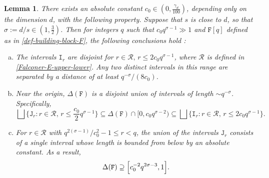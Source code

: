 \documentclass[a4paper,11pt]{amsart}
\newtheorem{lem}[thm]{\bf Lemma}
\numberwithin{equation}{section}
\begin{document}
 \begin{lem} \label{building-block-example-lemma} 
 There exists an absolute constant $c_0 \in (0, \frac{\gamma_d}{100})$, depending only on the dimension $d$, with the following property.
 \vskip0.1in
\noindent Suppose that $s$ is close to $d$, so that $\sigma := d/s \in (1, \frac{3}{2})$. Then for integers $q$ such that $c_0 q^{\sigma - 1} \gg 1$ and $\mathtt F[q]$ defined as in \eqref{def-building-block-F}, the following conclusions hold :
\vskip0.1in 
 \begin{enumerate}[(a)]
 \item The intervals $\mathtt I_r$ are disjoint for $r \in \mathcal R, \, r \leq 2c_0q^{\sigma-1}$, where $\mathcal R$ is defined in \eqref{Falconer-E-upper-lower}.  Any two distinct intervals in this range are separated by a distance of at least $q^{-\sigma}/(8c_0)$.\label{disjointness}
 \vskip0.1in
 \item 
 Near the origin, $\Delta(\mathtt F)$ is a disjoint union of intervals of length $\sim q^{-\sigma}$. Specifically, 
 \begin{equation} \bigsqcup \bigl\{\mathtt J_r : r \in \mathcal R, \, r \leq \frac{c_0}{2}q^{\sigma-1} \bigr\} \subseteq \Delta(\mathtt F) \cap \bigl[0, c_0q^{\sigma-2} \bigr) \subseteq \bigsqcup \bigl\{\mathtt I_r : r \in \mathcal R, \,  r \leq 2c_0 q^{\sigma-1} \bigr\}. \label{F-E-small-r} \end{equation} \label{small-disjoint-intervals}
 \item For $r \in \mathcal R$ with ${q^{2(\sigma-1)}}/{c_0^2} - 1\leq r < q$, the union of the intervals $\mathtt J_r$ consists of a single interval whose length is bounded from below by an absolute constant. As a result, 
 \begin{equation} \label{large-interval} 
 \Delta(\mathtt F) \supseteq   \Bigl[c_0^{-2}q^{2\sigma -3}, 1 \Bigr].
 \end{equation} 
 \label{large-single-interval}
 \end{enumerate} 
 \end{lem} 
\end{document}
